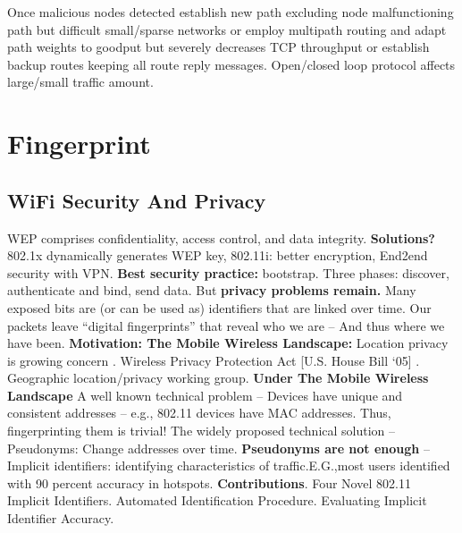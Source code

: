 \documentclass[9pt]{extarticle}
\begin{document}
\begin{multicols}{2}
Once malicious nodes detected establish new path excluding node malfunctioning path but difficult small/sparse networks or employ multipath routing and adapt path weights to goodput but severely decreases TCP throughput or establish backup routes keeping all route reply messages. Open/closed loop protocol affects large/small traffic amount.

\section{Fingerprint}

\subsection{WiFi Security And Privacy}

WEP comprises confidentiality, access control, and data integrity. \textbf{Solutions?} 802.1x dynamically generates WEP key, 802.11i: better encryption, End2end security with VPN. \textbf{Best security practice:} bootstrap. Three phases: discover, authenticate and bind, send data. But \textbf{privacy problems remain.} Many exposed bits are (or can be used as) identifiers that are linked over time. Our packets leave “digital fingerprints” that reveal who we are -- And thus where we have been. \textbf{Motivation: The Mobile Wireless Landscape:} Location privacy is growing concern
. Wireless Privacy Protection Act [U.S. House Bill ‘05]
. Geographic location/privacy working group. \textbf{Under The Mobile Wireless Landscape} A well known technical problem
– Devices have unique and consistent addresses – e.g., 802.11 devices have MAC addresses. Thus, fingerprinting them is trivial! The widely proposed technical solution – Pseudonyms: Change addresses over time. \textbf{Pseudonyms are not enough}
– Implicit identifiers: identifying characteristics of traffic.E.G.,most users identified with 90 percent accuracy in hotspots. \textbf{Contributions}. Four Novel 802.11 Implicit Identifiers. Automated Identification Procedure. Evaluating Implicit Identifier Accuracy.


\end{multicols}
\end{document}
